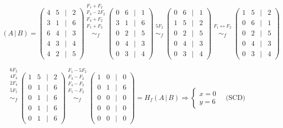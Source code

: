 \documentclass[a4paper,12pt]{article}
\begin{document}
\begin{ejercicio}[title=Ejercicio 26]
\[
(A\,|\,B)=
\begin{pmatrix}
4 & 5 &\Big|& 2\\
3 & 1 &\Big|& 6\\
6 & 4 &\Big|& 3\\
4 & 3 &\Big|& 4\\
4 & 2 &\Big|& 5
\end{pmatrix}
\overset{\substack{F_1+F_2\\F_3-2F_2\\F_4+F_2\\F_5+F_2\\{}}}{\sim_f}
\begin{pmatrix}
0 & 6 &\Big|& 1\\
3 & 1 &\Big|& 6\\
0 & 2 &\Big|& 5\\
0 & 4 &\Big|& 3\\
0 & 3 &\Big|& 4
\end{pmatrix}
\overset{\substack{5F_2\\{}}}{\sim_f}
\begin{pmatrix}
0 & 6 &\Big|& 1\\
1 & 5 &\Big|& 2\\
0 & 2 &\Big|& 5\\
0 & 4 &\Big|& 3\\
0 & 3 &\Big|& 4
\end{pmatrix}
\overset{\substack{F_1 \leftrightarrow F_2\\{}}}{\sim_f}
\begin{pmatrix}
1 & 5 &\Big|& 2\\
0 & 6 &\Big|& 1\\
0 & 2 &\Big|& 5\\
0 & 4 &\Big|& 3\\
0 & 3 &\Big|& 4
\end{pmatrix}
\]

\[
\overset{\substack{6F_2\\4F_3\\2F_4\\5F_5\\{}}}{\sim_f}
\begin{pmatrix}
1 & 5 &\Big|& 2\\
0 & 1 &\Big|& 6\\
0 & 1 &\Big|& 6\\
0 & 1 &\Big|& 6\\
0 & 1 &\Big|& 6
\end{pmatrix}
\overset{\substack{F_1 - 5F_2\\F_3 - F_2\\F_4 - F_2\\F_5 - F_2\\{}}}{\sim_f}
\begin{pmatrix}
1 & 0 &\Big|& 0\\
0 & 1 &\Big|& 6\\
0 & 0 &\Big|& 0\\
0 & 0 &\Big|& 0\\
0 & 0 &\Big|& 0
\end{pmatrix}
= H_f(A\,|\,B)
\Rightarrow
\begin{cases}
x = 0\\[4pt]
y = 6
\end{cases}
\quad \text{(SCD)}
\]


\end{ejercicio}
\end{document}
